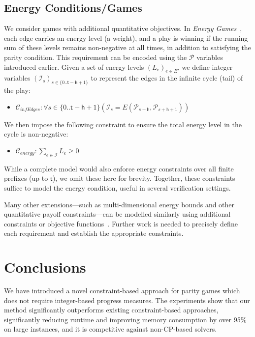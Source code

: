 \documentclass[runningheads]{llncs}
\begin{document}
\subsection{Energy Conditions/Games}

We consider games with additional quantitative objectives. In \textit{Energy Games}~\cite{ChatterjeeDoyen:2012}, each edge carries an energy level (a weight), and a play is winning if the running sum of these levels remains non-negative at all times, in addition to satisfying the parity condition.
%
This requirement can be encoded using the $\mathcal{P}$ variables introduced earlier. Given a set of energy levels $(L_e)_{e \in E}$, we define integer variables $(\mathcal{I}_s)_{s \in \{0..\mathsf{t} - \mathsf{h} + 1\}}$ to represent the edges in the infinite cycle (tail) of the play:

\begin{itemize}
    \item $\mathcal{C}_{\textit{infEdges}} : \forall s \in \{0..\mathsf{t} - \mathsf{h} + 1\} (\mathcal{I}_s = E(\mathcal{P}_{s+\mathsf{h}}, \mathcal{P}_{s+\mathsf{h}+1}))$
\end{itemize}

We then impose the following constraint to ensure the total energy level in the cycle is non-negative:

\begin{itemize}
    \item $\mathcal{C}_{\textit{energy}} : \sum_{e \in \mathcal{I}} L_e \geq 0$
\end{itemize}

While a complete model would also enforce energy constraints over all finite prefixes (up to $\mathsf{t}$), we omit these here for brevity. Together, these constraints suffice to model the energy condition, useful in several verification settings. 

Many other extensions---such as multi-dimensional energy bounds and other quantitative payoff constraints---can be modelled similarly using additional constraints or objective functions~\cite{bozzelly:2020,Fijalkow:2014,Mogavero:2015,Weinert:2016}. Further work is needed to precisely define each requirement and establish the appropriate constraints.

\section{Conclusions}
We have introduced a novel constraint-based approach for parity games which does not require integer-based progress measures. The experiments show that our method significantly outperforms existing constraint-based approaches, significantly reducing runtime and improving memory consumption by over 95\% on large instances, and it is competitive against non-CP-based solvers. 
\end{document}
